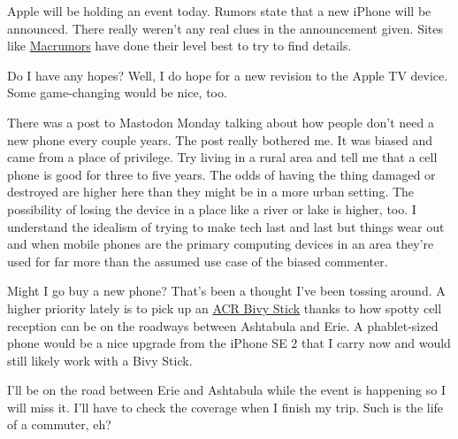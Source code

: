 Apple will be holding an event today. Rumors state that a new iPhone
will be announced. There really weren't any real clues in the
announcement given. Sites like
\href{https://www.macrumors.com/}{Macrumors} have done their level best
to try to find details.

Do I have any hopes? Well, I do hope for a new revision to the Apple TV
device. Some game-changing would be nice, too.

There was a post to Mastodon Monday talking about how people don't need
a new phone every couple years. The post really bothered me. It was
biased and came from a place of privilege. Try living in a rural area
and tell me that a cell phone is good for three to five years. The odds
of having the thing damaged or destroyed are higher here than they might
be in a more urban setting. The possibility of losing the device in a
place like a river or lake is higher, too. I understand the idealism of
trying to make tech last and last but things wear out and when mobile
phones are the primary computing devices in an area they're used for far
more than the assumed use case of the biased commenter.

Might I go buy a new phone? That's been a thought I've been tossing
around. A higher priority lately is to pick up an
\href{https://bivystick.com/}{ACR Bivy Stick} thanks to how spotty cell
reception can be on the roadways between Ashtabula and Erie. A
phablet-sized phone would be a nice upgrade from the iPhone SE 2 that I
carry now and would still likely work with a Bivy Stick.

I'll be on the road between Erie and Ashtabula while the event is
happening so I will miss it. I'll have to check the coverage when I
finish my trip. Such is the life of a commuter, eh?

